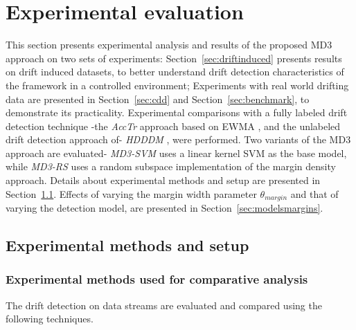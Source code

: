 \documentclass[authoryear,3p,times,twocolumn]{elsarticle}
\begin{document}
\section{Experimental evaluation}
\label{sec:experiment}

This section presents experimental analysis and results of the proposed MD3 approach on two sets of experiments: Section~\ref{sec:driftinduced} presents results on drift induced datasets, to better understand drift detection characteristics of the framework in a controlled environment; Experiments with real world drifting data are presented in Section~\ref{sec:cdd} and Section~\ref{sec:benchmark}, to demonstrate its practicality. Experimental comparisons with a fully labeled drift detection technique -the \textit{AccTr} approach based on EWMA \citep{ross2012exponentially}, and the unlabeled drift detection approach of- \textit{HDDDM} \citep{ditzler2011hellinger}, were performed. Two variants of the MD3 approach are evaluated- \textit{MD3-SVM} uses a linear kernel SVM as the base model, while \textit{MD3-RS }uses a random subspace implementation of the margin density approach. Details about experimental methods and setup are presented in Section~\ref{sec:experimental_methods}. Effects of varying the margin width parameter $\theta_{margin}$ and that of varying the detection model, are presented in Section~\ref{sec:modelsmargins}. 

\subsection{Experimental methods and setup}
\label{sec:experimental_methods}

\subsubsection{Experimental methods used for comparative analysis}
\label{sec:methods_comparative}

The drift detection on data streams are evaluated and compared using the following techniques. 
\end{document}
